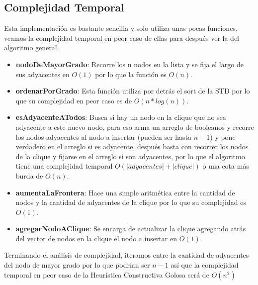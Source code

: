\subsection{Complejidad Temporal}

Esta implementación es bastante sencilla y solo utiliza unas pocas funciones, veamos la complejidad temporal en peor caso de ellas para después ver la del algoritmo general.

\begin{itemize}
	\item \textbf{nodoDeMayorGrado}: Recorre los n nodos en la lista y se fija el largo de sus adyacentes en $O(1)$ por lo que la función es $O(n)$.

	\item \textbf{ordenarPorGrado}: Esta función utiliza por detrás el sort de la STD por lo que su complejidad en peor caso es de $O(n*log(n))$.

    \item \textbf{esAdyacenteATodos}: Busca si hay un nodo en la clique que no sea adyacente a este nuevo nodo, para eso arma un arreglo de booleanos y recorre los nodos adyacentes al nodo a insertar (pueden ser hasta $n-1$) y pone verdadero en el arreglo si es adyacente, después basta con recorrer los nodos de la clique y fijarse en el arreglo si son adyacentes, por lo que el algoritmo tiene una complejidad temporal $O(|adyacentes| + |clique|)$ o una cota más burda de $O(n)$.

    \item \textbf{aumentaLaFrontera}: Hace una simple aritmética entre la cantidad de nodos y la cantidad de adyacentes de la clique por lo que su complejidad es $O(1)$.

    \item \textbf{agregarNodoAClique}: Se encarga de actualizar la clique agregando atrás del vector de nodos en la clique el nodo a insertar en $O(1)$.

\end{itemize}

Terminando el análisis de complejidad, iteramos entre la cantidad de adyacentes del nodo de mayor grado por lo que podrían ser $n-1$ así que la complejidad temporal en peor caso de la Heurística Constructiva Golosa será de $O(n^2)$

